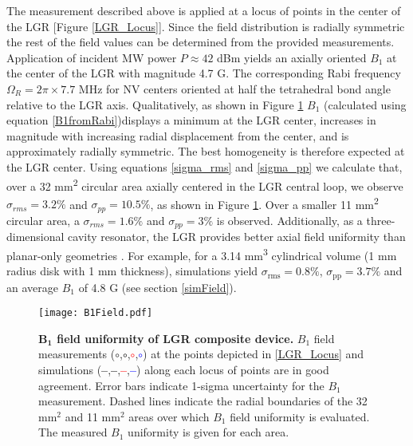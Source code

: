The measurement described above is applied at a locus of points in the center of the LGR [Figure \ref{LGR_Locus}]. Since the field distribution is radially symmetric the rest of the field values can be determined from the provided measurements. Application of incident MW power $P \approx 42$ dBm yields an axially oriented $B_1$ at the center of the LGR with magnitude 4.7 G. The corresponding Rabi frequency $\Omega_R = 2\pi \times 7.7$ MHz for NV centers oriented at half the tetrahedral bond angle relative to the LGR axis. Qualitatively, as shown in Figure \ref{LGR_Field_Image} $B_1$ (calculated using equation \ref{B1fromRabi})displays a minimum at the LGR center, increases in magnitude with increasing radial displacement from the center, and is approximately radially symmetric. The best homogeneity is therefore expected at the LGR center. Using equations \ref{sigma_rms} and \ref{sigma_pp} we calculate that, over a 32 mm\textsuperscript{2} circular area axially centered in the LGR
central loop, we observe $\sigma_{rms} = 3.2\%$ and $\sigma_{pp} = 10.5\%$, as shown in Figure \ref{LGR_Field_Image}. Over a smaller 11 mm\textsuperscript{2} circular area, a $\sigma_{rms} = 1.6\%$ and $\sigma_{pp} = 3\%$ is observed. Additionally, as a three-dimensional cavity resonator, the LGR provides better axial field uniformity than planar-only geometries \cite{floch2016towards,kapitanova2017dielectric,angerer2016collective}. For example, for a 3.14 mm\textsuperscript{3} cylindrical volume (1 mm radius disk with 1 mm thickness), simulations yield $\sigma_{\text{rms}}=0.8\%$, $\sigma_{\text{pp}}=3.7\%$ and an average $B_1$ of 4.8 G (see section \ref{simField}).


\begin{figure}[t!]
\centering
\texttt{[image: B1Field.pdf]}  
\caption{\textbf{$\boldsymbol{B_1}$ field uniformity of LGR composite device.} $B_1$ field measurements (\textcolor{deepmagenta}{$\circ$},\textcolor{black}{$\circ$},\textcolor{red}{$\circ$},\textcolor{blue}{$\circ$}) at the points depicted in \ref{LGR_Locus} and simulations (\textcolor{deepmagenta}{\textbf{--}},\textcolor{black}{\textbf{--}},\textcolor{red}{\textbf{--}},\textcolor{blue}{\textbf{--}}) along each locus of points are in good agreement. Error bars indicate 1-sigma uncertainty for the $B_1$ measurement. Dashed lines indicate the radial boundaries of the 32 mm$^2$ and 11 mm$^2$ areas over which $B_1$ field uniformity is evaluated. The measured $B_1$ uniformity is given for each area.}
\label{LGR_Field_Image}
\end{figure}



